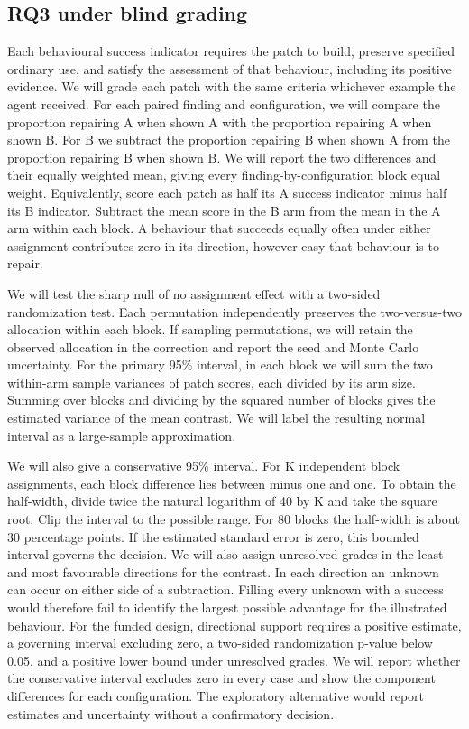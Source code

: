 \subsection{RQ3 under blind grading}

Each behavioural success indicator requires the patch to build, preserve specified ordinary use, and satisfy the assessment of that behaviour, including its positive evidence. We will grade each patch with the same criteria whichever example the agent received. For each paired finding and configuration, we will compare the proportion repairing A when shown A with the proportion repairing A when shown B. For B we subtract the proportion repairing B when shown A from the proportion repairing B when shown B. We will report the two differences and their equally weighted mean, giving every finding-by-configuration block equal weight. Equivalently, score each patch as half its A success indicator minus half its B indicator. Subtract the mean score in the B arm from the mean in the A arm within each block. A behaviour that succeeds equally often under either assignment contributes zero in its direction, however easy that behaviour is to repair.

We will test the sharp null of no assignment effect with a two-sided randomization test. Each permutation independently preserves the two-versus-two allocation within each block. If sampling permutations, we will retain the observed allocation in the correction and report the seed and Monte Carlo uncertainty. For the primary 95\% interval, in each block we will sum the two within-arm sample variances of patch scores, each divided by its arm size. Summing over blocks and dividing by the squared number of blocks gives the estimated variance of the mean contrast. We will label the resulting normal interval as a large-sample approximation.

We will also give a conservative 95\% interval. For K independent block assignments, each block difference lies between minus one and one. To obtain the half-width, divide twice the natural logarithm of 40 by K and take the square root. Clip the interval to the possible range. For 80 blocks the half-width is about 30 percentage points. If the estimated standard error is zero, this bounded interval governs the decision. We will also assign unresolved grades in the least and most favourable directions for the contrast. In each direction an unknown can occur on either side of a subtraction. Filling every unknown with a success would therefore fail to identify the largest possible advantage for the illustrated behaviour. For the funded design, directional support requires a positive estimate, a governing interval excluding zero, a two-sided randomization p-value below 0.05, and a positive lower bound under unresolved grades. We will report whether the conservative interval excludes zero in every case and show the component differences for each configuration. The exploratory alternative would report estimates and uncertainty without a confirmatory decision.

